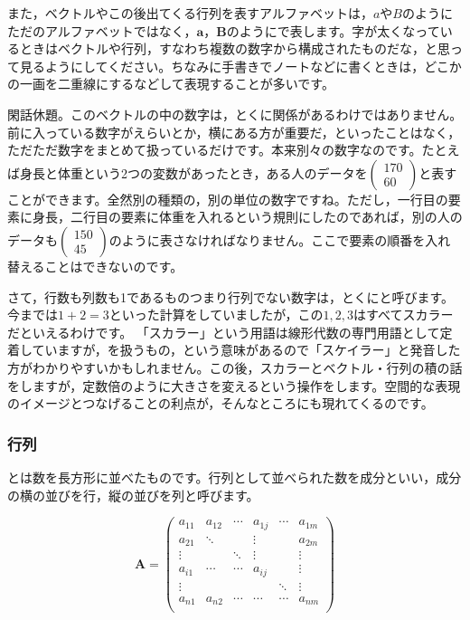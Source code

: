 \documentclass{ltjsbook}
\begin{document}
また，ベクトルやこの後出てくる行列を表すアルファベットは，$a$や$B$のようにただのアルファベットではなく，$\bm{a}$，$\bm{B}$のようにで表します。字が太くなっているときはベクトルや行列，すなわち複数の数字から構成されたものだな，と思って見るようにしてください。ちなみに手書きでノートなどに書くときは，どこかの一画を二重線にするなどして表現することが多いです。

閑話休題。このベクトルの中の数字は，とくに関係があるわけではありません。前に入っている数字がえらいとか，横にある方が重要だ，といったことはなく，ただただ数字をまとめて扱っているだけです。本来別々の数字なのです。たとえば身長と体重という2つの変数があったとき，ある人のデータを$ \begin{pmatrix} 170 \\ 60 \end{pmatrix} $と表すことができます。全然別の種類の，別の単位の数字ですね。ただし，一行目の要素に身長，二行目の要素に体重を入れるという規則にしたのであれば，別の人のデータも$\begin{pmatrix} 150 \\ 45 \end{pmatrix}$のように表さなければなりません。ここで要素の順番を入れ替えることはできないのです。

さて，行数も列数も1であるものつまり行列でない数字は，とくにと呼びます。今までは$1+2=3$といった計算をしていましたが，この$1,2,3$はすべてスカラーだといえるわけです。
「スカラー」という用語は線形代数の専門用語として定着していますが，を扱うもの，という意味があるので「スケイラー」と発音した方がわかりやすいかもしれません。この後，スカラーとベクトル・行列の積の話をしますが，定数倍のように大きさを変えるという操作をします。空間的な表現のイメージとつなげることの利点が，そんなところにも現れてくるのです。

\subsubsection{行列}
とは数を長方形に並べたものです。行列として並べられた数を成分といい，成分の横の並びを行，縦の並びを列と呼びます。

\begin{equation*}
    \bm{A}=
    \begin{pmatrix}
        a_{11} & a_{12} & \cdots & a_{1j} & \cdots & a_{1m} \\
        a_{21} & \ddots &        & \vdots &        & a_{2m} \\
        \vdots &        & \ddots & \vdots &        & \vdots \\
        a_{i1} & \cdots & \cdots & a_{ij} &        & \vdots \\
        \vdots &        &        &        & \ddots & \vdots \\
        a_{n1} & a_{n2} & \cdots & \cdots & \cdots & a_{nm} \\
    \end{pmatrix}
\end{equation*}
\end{document}
